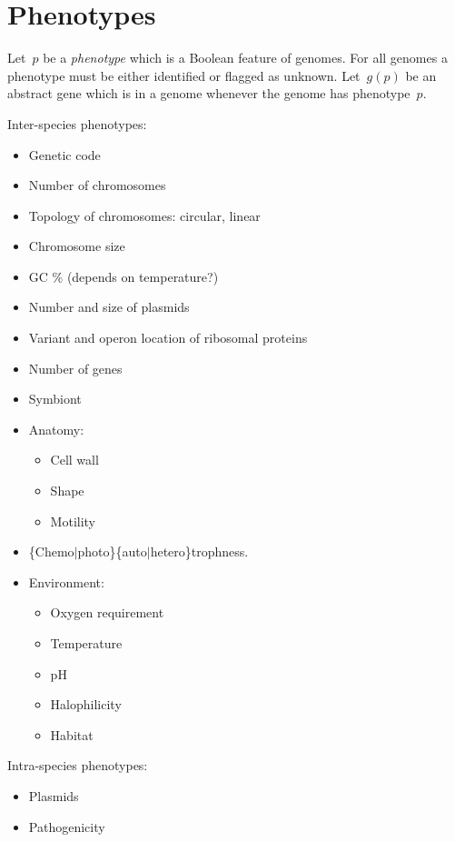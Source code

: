 \documentclass[10pt,a4paper]{article}
\theoremstyle{plain} \newtheorem{Lem}{Lemma}
\begin{document}
\section{Phenotypes}
Let~$p$ be a {\em phenotype} which is a Boolean feature of genomes.
For all genomes a phenotype must be either identified or flagged as unknown.
Let~$g(p)$ be an abstract gene which is in a genome whenever the genome has phenotype~$p$.

Inter-species phenotypes:
\begin{itemize}
	\item Genetic code
	\item Number of chromosomes
	\item Topology of chromosomes: circular, linear
	\item Chromosome size
	\item GC \% (depends on temperature?)
	\item Number and size of plasmids
	\item Variant and operon location of ribosomal proteins
	\item Number of genes
	\item Symbiont
	\item Anatomy:
	\begin{itemize}
		\item Cell wall
		\item Shape
		\item Motility
	\end{itemize}
	\item \{Chemo$|$photo\}\{auto$|$hetero\}trophness.
    \item Environment:
	\begin{itemize}
		\item Oxygen requirement
		\item Temperature
		\item pH
		\item Halophilicity
		\item Habitat
	\end{itemize}
\end{itemize}


Intra-species phenotypes:
\begin{itemize}
  \item Plasmids
  \item Pathogenicity
\end{itemize}
\end{document}
